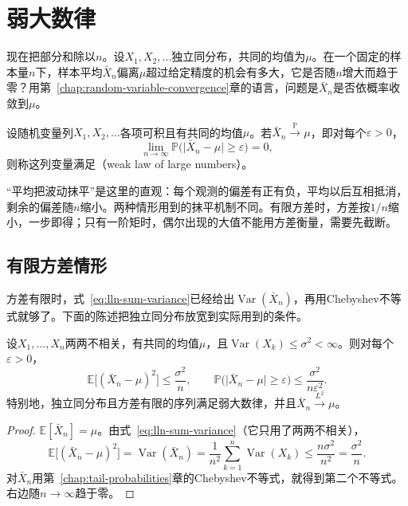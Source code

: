 \section{弱大数律}
\label{sec:lln-weak-law}

现在把部分和除以$n$。设$X_1,X_2,\dots$独立同分布，共同的均值为$\mu$。在一个固定的样本量$n$下，样本平均$\bar{X}_n$偏离$\mu$超过给定精度的机会有多大，它是否随$n$增大而趋于零？用第~\ref{chap:random-variable-convergence}章的语言，问题是$\bar{X}_n$是否依概率收敛到$\mu$。

\begin{definition}[弱大数律]
\label{def:lln-weak-law}
设随机变量列$X_1,X_2,\dots$各项可积且有共同的均值$\mu$。若$\bar{X}_n\xrightarrow{\mathbb{P}}\mu$，即对每个$\varepsilon>0$，
\begin{equation}
 \lim_{n\to\infty}\mathbb{P}\bigl(\lvert\bar{X}_n-\mu\rvert\geq\varepsilon\bigr)=0 ,
 \label{eq:lln-weak-law}
\end{equation}
则称这列变量满足（weak law of large numbers）。
\end{definition}

“平均把波动抹平”是这里的直观：每个观测的偏差有正有负，平均以后互相抵消，剩余的偏差随$n$缩小。两种情形用到的抹平机制不同。有限方差时，方差按$1/n$缩小，一步即得；只有一阶矩时，偶尔出现的大值不能用方差衡量，需要先截断。

\subsection{有限方差情形}
\label{sec:lln-wlln-variance}

方差有限时，式~\eqref{eq:lln-sum-variance}已经给出$\operatorname{Var}(\bar{X}_n)$，再用Chebyshev不等式就够了。下面的陈述把独立同分布放宽到实际用到的条件。

\begin{theorem}[有限方差的弱大数律]
\label{thm:lln-wlln-variance}
设$X_1,\dots,X_n$两两不相关，有共同的均值$\mu$，且$\operatorname{Var}(X_k)\leq\sigma^2<\infty$。则对每个$\varepsilon>0$，
\begin{equation}
 \mathbb{E}\bigl[(\bar{X}_n-\mu)^2\bigr]\leq\frac{\sigma^2}{n},\qquad
 \mathbb{P}\bigl(\lvert\bar{X}_n-\mu\rvert\geq\varepsilon\bigr)\leq\frac{\sigma^2}{n\varepsilon^2} .
 \label{eq:lln-wlln-chebyshev}
\end{equation}
特别地，独立同分布且方差有限的序列满足弱大数律，并且$\bar{X}_n\xrightarrow{L^{2}}\mu$。
\end{theorem}

\begin{proof}
$\mathbb{E}[\bar{X}_n]=\mu$。由式~\eqref{eq:lln-sum-variance}（它只用了两两不相关），
\[
 \mathbb{E}\bigl[(\bar{X}_n-\mu)^2\bigr]=\operatorname{Var}(\bar{X}_n)=\frac{1}{n^2}\sum_{k=1}^{n}\operatorname{Var}(X_k)\leq\frac{n\sigma^2}{n^2}=\frac{\sigma^2}{n} .
\]
对$\bar{X}_n$用第~\ref{chap:tail-probabilities}章的Chebyshev不等式，就得到第二个不等式。右边随$n\to\infty$趋于零。
\end{proof}

